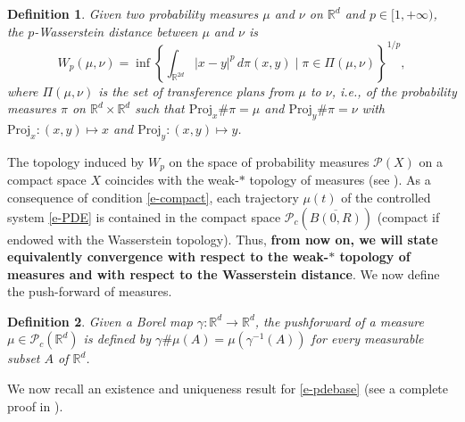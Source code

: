 \documentclass{article}
\newcommand{\R}{\mathbb{R}}
\renewcommand{\P}{\mathcal{P}_c(\R^d)}
\newcommand{\PR}{\mathcal{P}_c(\overline{B(0,R)})}
\newtheorem{definition}{Definition}[section]
\theoremstyle{definition}\newtheorem{remark}{Remark}
\renewcommand{\r}[1]{\eqref{#1}}
\begin{document}
\begin{definition}
Given two probability measures $\mu$ and $\nu$ on $\R^d$ and $p\in[1,+\infty)$, the $p$-Wasserstein distance between $\mu$ and $\nu$ 
is
$$
W_p(\mu,\nu) = \inf\left\{ \int_{\R^{2d}} |x-y|^p\,d\pi(x,y) \mid  \pi\in\Pi(\mu,\nu) \right\}^{1/p},
$$
where $\Pi(\mu,\nu)$ is the set of transference plans from $\mu$ to $\nu$, i.e., of the probability measures $\pi$ on $\R^{d} \times \R^d$ such that 
$\mathrm{Proj}_x \# \pi =\mu$ and $\mathrm{Proj}_y \#\pi=\nu$ with  $\mathrm{Proj}_x:(x,y) \mapsto x$ and $\mathrm{Proj}_y:(x,y) \mapsto y$.
\end{definition}

The topology induced by $W_p$ on the space of probability measures $\mathcal{P}(X)$ on a compact space $X$ coincides with the weak-$*$ topology of measures (see \cite[Theorem 7.12]{villani}). As a consequence of  condition \r{e-compact}, each trajectory $\mu(t)$ of the controlled system \r{e-PDE} is contained in the compact space $\PR$ (compact if endowed with the Wasserstein topology). Thus, {\bf from now on, we will state equivalently convergence with respect to the  weak-$*$ topology of measures and with respect to the Wasserstein distance}.
We now define the push-forward of measures.

\begin{definition} 
Given a Borel map $\gamma:\R^d\rightarrow\R^d$, the pushforward of a measure $\mu\in \P$ is defined by
$\gamma\#\mu(A)=\mu(\gamma^{-1}(A))$
for every measurable subset $A$ of $\R^d$.
\end{definition}

We now recall an existence and uniqueness result for \eqref{e-pdebase} (see a complete proof in  \cite{controlKCS}).
\end{document}
